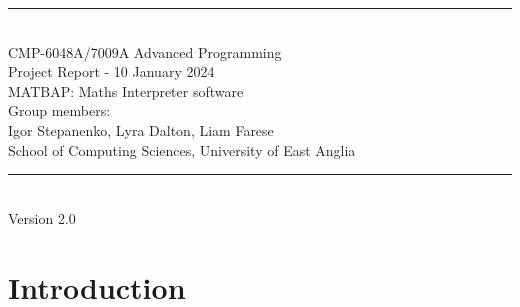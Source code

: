 \documentclass[a4paper, oneside, 11pt]{report}
\begin{document}
\begin{titlepage}
\begin{center}
\rule{12cm}{1mm} \\
\vspace{1cm}
{\large  CMP-6048A/7009A Advanced Programming} %
\vspace{7.5cm}
\\{\Large Project Report - 10 January 2024}
\vspace{1.5cm}
\\{\LARGE MATBAP: Maths Interpreter software} %
\vspace{1.0cm}
\\{\Large Group members: \\ Igor Stepanenko, Lyra Dalton, Liam Farese\ }
\vspace{10.0cm}
\\{\large School of Computing Sciences, University of East Anglia}
\\ \rule{12cm}{0.5mm}
\\ \hspace{8.5cm} {\large Version 2.0}
\end{center}
\end{titlepage}


\setcounter{page}{1}


\begin{abstract}
Please replace this section with your own abstract. An abstract is a brief summary (maximum 250 words) of your entire project. It should cover your objectives, your methodologies used, a brief developmental history, your final results, in particular covering the optional tasks, and a discussion and conclusion. You do not cover the literature or background in an abstract nor should you use abbreviations or acronyms. The remainder of this report template has clear chapter titles and we suggest to stick to these although you can organise your material inside each chapter to your own preferences. A guideline in size is approximately 3,500 words (not including abstract, captions and references) but no real limit on figures, tables, diagrams, pseudo-code etc.
\end{abstract}

\chapter{Introduction}
\label{chap:intro}
\end{document}
